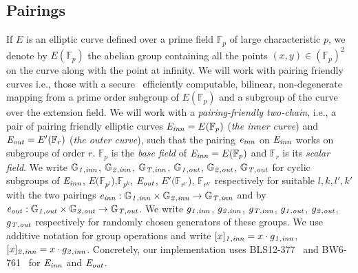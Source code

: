 \vspace{-0.05in}
\subsection{Pairings}
\label{sec:pairings}
\noindent If $E$ is an elliptic curve defined over a prime field $\mathbb{F}_{p}$ of large characteristic $p$, 
we denote by $E(\mathbb{F}_{p})$ the abelian group containing all the points $(x, y) \in (\mathbb{F}_{p})^2$ 
on the curve along with the point at infinity. We will work with pairing friendly curves i.e., those with a secure~\cite{secure_pairings,pairings_for_cryptographers} efficiently computable, bilinear, non-degenerate mapping from a prime order subgroup of $E(\mathbb{F}_{p})$ and a subgroup of the curve over the extension field.
We will work with a \emph{pairing-friendly two-chain}, i.e., a pair of pairing friendly elliptic curves $\mathit{E}_{\mathit{inn}}=E(\mathbb{F}_{p})$ (\emph{the inner curve}) and $\mathit{E}_{\mathit{out}}=E'(\mathbb{F}_{r})$ (\emph{the outer curve}), such that the pairing $\mathit{e}_{\mathit{inn}}$ on $\mathit{E}_{\mathit{inn}}$ works on subgroups of order $r$. $\mathbb{F}_p$ is the \emph{base field} of $\mathit{E}_{\mathit{inn}}=E(\mathbb{F}_{p})$ and $\mathbb{F}_r$ is its \emph{scalar field}. 
We write $\mathbb{G}_{\mathit{1,inn}}$, $\mathbb{G}_{\mathit{2,inn}}$, $\mathbb{G}_{\mathit{T,inn}}$, $\mathbb{G}_{\mathit{1,out}}$, $\mathbb{G}_{\mathit{2,out}}$, $\mathbb{G}_{\mathit{T,out}}$ for cyclic subgroups of $\mathit{E}_{\mathit{inn}}$, $E(\mathbb{F}_{p^l}$),$\mathbb{F}_{p^k}$, $\mathit{E}_{\mathit{out}}$, $E'(\mathbb{F}_{r^{l'}}$), $\mathbb{F}_{r^{k'}}$ respectively for suitable $l,k,l',k'$ with the two pairings $\mathit{e}_{\mathit{inn}}:\mathbb{G}_{\mathit{1,inn}} \times \mathbb{G}_{\mathit{2,inn}} \rightarrow \mathbb{G}_{\mathit{T,inn}}$ and by $\mathit{e}_{\mathit{out}}:\mathbb{G}_{\mathit{1,out}} \times \mathbb{G}_{\mathit{2,out}} \rightarrow \mathbb{G}_{\mathit{T,out}}$.
We write $g_{\mathit{1,inn}}$, $g_{\mathit{2,inn}}$, $g_{\mathit{T,inn}}$, $g_{\mathit{1,out}}$, $g_{\mathit{2,out}}$, $g_{\mathit{T,out}}$ respectively for randomly chosen generators of these groups. We use additive notation for group operations and write $[x]_{\mathit{1,inn}} = x \cdot g_{\mathit{1,inn}}$, $[x]_{\mathit{2,inn}} = x \cdot g_{\mathit{2,inn}}$. Concretely, our implementation uses BLS12-377~\cite{zexe} and BW6-761~\cite{BW6} for $\mathit{E}_{\mathit{inn}}$ and $\mathit{E}_{\mathit{out}}$.
\vspace{-0.05in}
